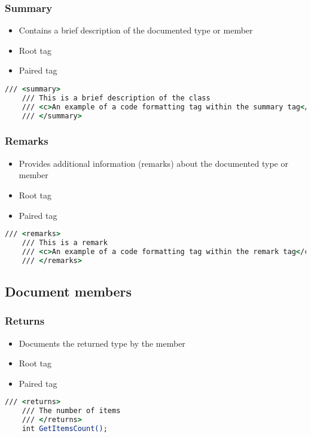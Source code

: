 \subsubsection*{Summary}
\begin{itemize}
    \item Contains a brief description of the documented type or member
    \item Root tag
    \item Paired tag
\end{itemize}

\begin{lstlisting}[language=csh]
    /// <summary>
    /// This is a brief description of the class
    /// <c>An example of a code formatting tag within the summary tag</c>
    /// </summary>
\end{lstlisting}

\subsubsection*{Remarks}
\begin{itemize}
    \item Provides additional information (remarks) about the documented type or member
    \item Root tag
    \item Paired tag
\end{itemize}

\begin{lstlisting}[language=csh]
    /// <remarks>
    /// This is a remark
    /// <c>An example of a code formatting tag within the remark tag</c>
    /// </remarks>
\end{lstlisting}

\subsection{Document members}

\subsubsection*{Returns}
\begin{itemize}
    \item Documents the returned type by the member
    \item Root tag
    \item Paired tag
\end{itemize}

\begin{lstlisting}[language=csh]
    /// <returns>
    /// The number of items
    /// </returns>
    int GetItemsCount();
\end{lstlisting}

